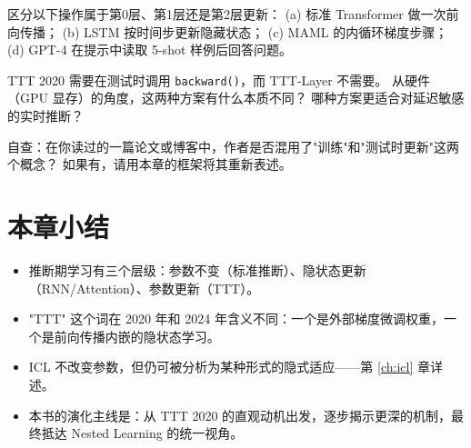 \begin{exercise}
区分以下操作属于第0层、第1层还是第2层更新：
(a) 标准 Transformer 做一次前向传播；
(b) LSTM 按时间步更新隐藏状态；
(c) MAML 的内循环梯度步骤；
(d) GPT-4 在提示中读取 5-shot 样例后回答问题。
\end{exercise}

\begin{exercise}
TTT 2020 需要在测试时调用 \texttt{backward()}，而 TTT-Layer 不需要。
从硬件（GPU 显存）的角度，这两种方案有什么本质不同？
哪种方案更适合对延迟敏感的实时推断？
\end{exercise}

\begin{exercise}
自查：在你读过的一篇论文或博客中，作者是否混用了"训练"和"测试时更新"这两个概念？
如果有，请用本章的框架将其重新表述。
\end{exercise}

\section{本章小结}

\begin{itemize}
  \item 推断期学习有三个层级：参数不变（标准推断）、隐状态更新（RNN/Attention）、参数更新（TTT）。
  \item "TTT" 这个词在 2020 年和 2024 年含义不同：一个是外部梯度微调权重，一个是前向传播内嵌的隐状态学习。
  \item ICL 不改变参数，但仍可被分析为某种形式的隐式适应——第 \ref{ch:icl} 章详述。
  \item 本书的演化主线是：从 TTT 2020 的直观动机出发，逐步揭示更深的机制，最终抵达 Nested Learning 的统一视角。
\end{itemize}
